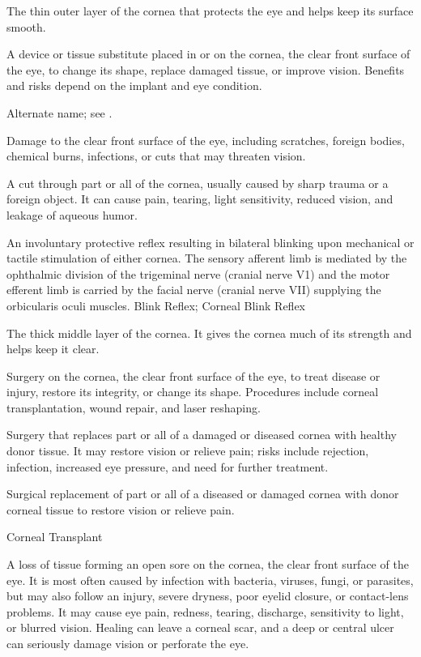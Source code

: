  The thin outer layer of the cornea that protects the eye and helps keep its surface smooth.

 A device or tissue substitute placed in or on the cornea, the clear front surface of the eye, to change its shape, replace damaged tissue, or improve vision. Benefits and risks depend on the implant and eye condition.

 Alternate name; see .

 Damage to the clear front surface of the eye, including scratches, foreign bodies, chemical burns, infections, or cuts that may threaten vision.

 A cut through part or all of the cornea, usually caused by sharp trauma or a foreign object. It can cause pain, tearing, light sensitivity, reduced vision, and leakage of aqueous humor.

 An involuntary protective reflex resulting in bilateral blinking upon mechanical or tactile stimulation of either cornea. The sensory afferent limb is mediated by the ophthalmic division of the trigeminal nerve (cranial nerve V1) and the motor efferent limb is carried by the facial nerve (cranial nerve VII) supplying the orbicularis oculi muscles.
\synonyms
Blink Reflex; Corneal Blink Reflex

 The thick middle layer of the cornea. It gives the cornea much of its strength and helps keep it clear.

 Surgery on the cornea, the clear front surface of the eye, to treat disease or injury, restore its integrity, or change its shape. Procedures include corneal transplantation, wound repair, and laser reshaping.

 Surgery that replaces part or all of a damaged or diseased cornea with healthy donor tissue. It may restore vision or relieve pain; risks include rejection, infection, increased eye pressure, and need for further treatment.

 Surgical replacement of part or all of a diseased or damaged cornea with donor corneal tissue to restore vision or relieve pain.

\synonyms
Corneal Transplant

 A loss of tissue forming an open sore on the cornea, the clear front surface of the eye. It is most often caused by infection with bacteria, viruses, fungi, or parasites, but may also follow an injury, severe dryness, poor eyelid closure, or contact-lens problems. It may cause eye pain, redness, tearing, discharge, sensitivity to light, or blurred vision. Healing can leave a corneal scar, and a deep or central ulcer can seriously damage vision or perforate the eye.

